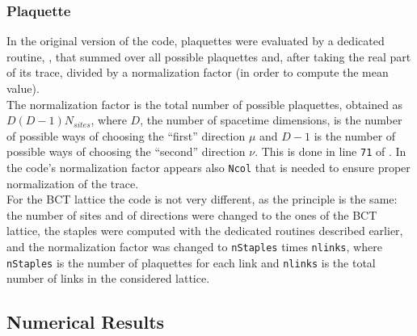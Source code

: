 \subsubsection{Plaquette}
In the original version of the code, plaquettes were evaluated by a dedicated routine, , that summed over all possible plaquettes and, after taking the real part of its trace, divided by a normalization factor (in order to compute the mean value).\\
The normalization factor is the total number of possible plaquettes, obtained as $D(D-1)N_{sites}$, where $D$, the number of spacetime dimensions, is the number of possible ways of choosing the ``first'' direction $\mu$ and $D-1$ is the number of possible ways of choosing the ``second'' direction $\nu$.
This is done in line \texttt{71} of .
In the code's normalization factor appears also \texttt{Ncol} that is needed to ensure proper normalization of the trace.\\
For the BCT lattice the code is not very different, as the principle is the same: the number of sites and of directions were changed to the ones of the BCT lattice, the staples were computed with the dedicated routines described earlier, and the normalization factor was changed to \texttt{nStaples} times \texttt{nlinks}, where \texttt{nStaples} is the number of plaquettes for each link and \texttt{nlinks} is the total number of links in the considered lattice.

\subsection{Numerical Results}
